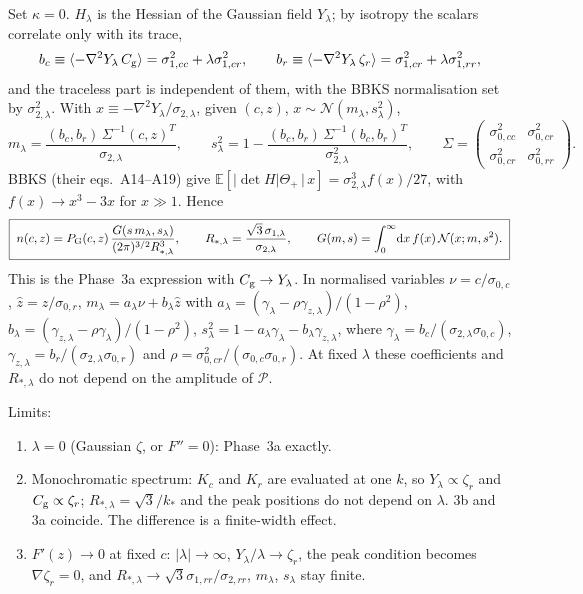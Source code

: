 \documentclass[11pt]{article}
\newcommand{\Cg}{C_{\rm g}}
\newcommand{\zr}{\zeta_r}
\newcommand{\dd}{\mathrm{d}}
\newcommand{\E}{\mathbb{E}}
\begin{document}
Set $\kappa=0$. $H_\lambda$ is the Hessian of the Gaussian field $Y_\lambda$; by isotropy the scalars
correlate only with its trace,
\begin{equation}
b_c\equiv\langle-\nabla^2Y_\lambda\,\Cg\rangle=\sigma^2_{1,cc}+\lambda\sigma^2_{1,cr},\qquad
b_r\equiv\langle-\nabla^2Y_\lambda\,\zr\rangle=\sigma^2_{1,cr}+\lambda\sigma^2_{1,rr},
\end{equation}
and the traceless part is independent of them, with the BBKS normalisation set by
$\sigma^2_{2,\lambda}$. With $x\equiv-\nabla^2Y_\lambda/\sigma_{2,\lambda}$, given $(c,z)$,
$x\sim\mathcal N(m_\lambda,s_\lambda^2)$,
\begin{equation}
m_\lambda=\frac{(b_c,b_r)\,\Sigma^{-1}(c,z)^T}{\sigma_{2,\lambda}},\qquad
s_\lambda^2=1-\frac{(b_c,b_r)\,\Sigma^{-1}(b_c,b_r)^T}{\sigma^2_{2,\lambda}},\qquad
\Sigma=\begin{pmatrix}\sigma^2_{0,cc}&\sigma^2_{0,cr}\\ \sigma^2_{0,cr}&\sigma^2_{0,rr}\end{pmatrix}.
\end{equation}
BBKS (their eqs.~A14--A19) give $\E[|\det H|\Theta_+\,|\,x]=\sigma^3_{2,\lambda}f(x)/27$, with
$f(x)\to x^3-3x$ for $x\gg1$. Hence
\begin{equation}
\boxed{\;n(c,z)=P_{\rm G}(c,z)\,\frac{G(s\,m_\lambda,s_\lambda)}{(2\pi)^{3/2}R_{*,\lambda}^3},\qquad
R_{*,\lambda}=\frac{\sqrt3\,\sigma_{1,\lambda}}{\sigma_{2,\lambda}},\qquad
G(m,s)=\int_0^\infty\!\dd x\,f(x)\,\mathcal N(x;m,s^2).\;}
\label{eq:n3b}
\end{equation}
This is the Phase~3a expression with $\Cg\to Y_\lambda$. In normalised variables
$\nu=c/\sigma_{0,c}$, $\hat z=z/\sigma_{0,r}$, $m_\lambda=a_\lambda\nu+b_\lambda\hat z$ with
$a_\lambda=(\gamma_\lambda-\rho\gamma_{z,\lambda})/(1-\rho^2)$,
$b_\lambda=(\gamma_{z,\lambda}-\rho\gamma_\lambda)/(1-\rho^2)$,
$s^2_\lambda=1-a_\lambda\gamma_\lambda-b_\lambda\gamma_{z,\lambda}$, where
$\gamma_\lambda=b_c/(\sigma_{2,\lambda}\sigma_{0,c})$,
$\gamma_{z,\lambda}=b_r/(\sigma_{2,\lambda}\sigma_{0,r})$ and
$\rho=\sigma^2_{0,cr}/(\sigma_{0,c}\sigma_{0,r})$. At fixed $\lambda$ these coefficients and
$R_{*,\lambda}$ do not depend on the amplitude of $\mathcal P$.

Limits:
\begin{enumerate}
\item $\lambda=0$ (Gaussian $\zeta$, or $F''=0$): Phase~3a exactly.
\item Monochromatic spectrum: $K_c$ and $K_r$ are evaluated at one $k$, so $Y_\lambda\propto\zr$
and $\Cg\propto\zr$; $R_{*,\lambda}=\sqrt3/k_*$ and the peak positions do not depend on $\lambda$.
3b and 3a coincide. The difference is a finite-width effect.
\item $F'(z)\to0$ at fixed $c$: $|\lambda|\to\infty$, $Y_\lambda/\lambda\to\zr$, the peak condition
becomes $\nabla\zr=0$, and $R_{*,\lambda}\to\sqrt3\sigma_{1,rr}/\sigma_{2,rr}$, $m_\lambda$,
$s_\lambda$ stay finite.
\end{enumerate}
\end{document}
